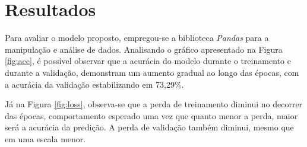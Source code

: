 \section{\esp Resultados} \label{results}




Para avaliar o modelo proposto, empregou-se a biblioteca \textit{Pandas} para a manipulação e análise de dados. Analisando o gráfico apresentado na Figura \ref{fig:acc}, é possível observar que a acurácia do modelo durante o treinamento e durante a validação, demonstram um aumento gradual ao longo das épocas, com a acurácia da validação estabilizando em 73,29\%.

Já na Figura \ref{fig:loss}, observa-se que a perda de treinamento diminui no decorrer das épocas, comportamento esperado uma vez que quanto menor a perda, maior será a acurácia da predição. A perda de validação também diminui, mesmo que em uma escala menor.


